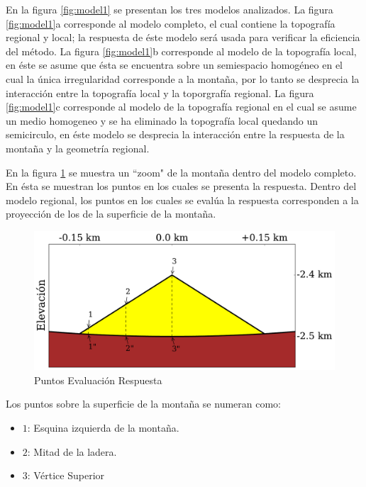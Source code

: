 \documentclass[spanish,letterpaper,12pt,twoside,openany]{article}
\begin{document}
En la figura \ref{fig:model1} se presentan los tres modelos analizados. La figura \ref{fig:model1}a corresponde al modelo completo, el cual contiene la topografía regional y local; la respuesta de éste modelo será usada para verificar la eficiencia del método. La figura \ref{fig:model1}b corresponde al modelo de la topografía local, en éste se asume que ésta se encuentra sobre un semiespacio homogéneo en el cual la única irregularidad corresponde a la montaña, por lo tanto se desprecia la interacción entre la topografía local y la toporgrafía regional. La figura \ref{fig:model1}c corresponde al modelo de la topografía regional en el cual se asume un medio homogeneo y se ha eliminado la topografía local quedando un semicirculo, en éste modelo se desprecia la interacción entre la respuesta de la montaña y la geometría regional. %

En la figura \ref{fig:puntos} se muestra un ``zoom" de la montaña dentro del modelo completo. En ésta se muestran los puntos en los cuales se presenta la respuesta. Dentro del modelo regional, los puntos en los cuales se evalúa la respuesta corresponden a la proyección de los de la superficie de la montaña.

\begin{figure}[H]
	\centering
	\includegraphics[width=12 cm]{img/ModelRegionalCompleteZoom.pdf}
	\vspace{-.5 cm}
	\caption{Puntos Evaluación Respuesta}
	\label{fig:puntos}
	\vspace{-1 cm}
\end{figure}
%

Los puntos sobre la superficie de la montaña se numeran como:
%
\begin{itemize}
%
	\item $1$: Esquina izquierda de la montaña.
	\item $2$: Mitad de la ladera.
	\item $3$: Vértice Superior
	\vspace{-.5 cm}
%
\end{itemize} 
\end{document}
